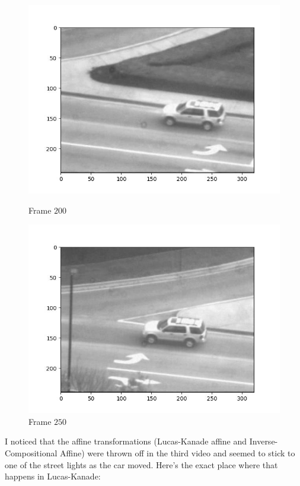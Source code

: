 \begin{figure}[H]
\begin{minipage}{.49\textwidth}
    \includegraphics[width=\textwidth]{./figures/lk_affine/car2/frame000200.jpg}
    \caption{Frame $200$}
  \end{minipage}
  \hfill
  \begin{minipage}{.49\textwidth}
    \centering
    \includegraphics[width=\textwidth]{./figures/lk_affine/car2/frame000250.jpg}
    \caption{Frame $250$}
  \end{minipage}
\end{figure}

\newpage
I noticed that the affine transformations (Lucas-Kanade affine and Inverse-Compositional Affine)
were thrown off in the third video and seemed to stick to one of the street lights
as the car moved.
Here's the exact place where that happens in Lucas-Kanade:

